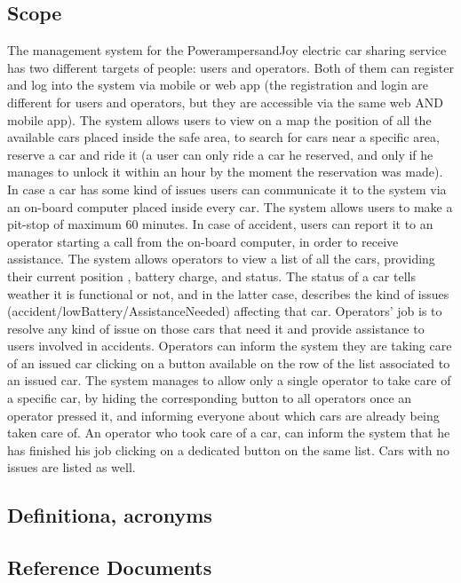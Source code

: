 \documentclass{article}
\begin{document}
\subsection{Scope} %
The management system for the  Power{ampersand}Joy electric car sharing service has two different targets of people: users and operators. 
Both of them can register and log into the system via mobile or web app (the registration and login are different for users and operators, but they are accessible via the same web AND mobile app). 
The system allows users to view on a map the position of all the available cars placed inside the safe area, to search for cars  near a specific area, reserve a car and ride it (a user can only ride a car he reserved, and only if he manages to unlock it within an hour by the moment the reservation was made). In case a car has some kind of issues users can communicate it to the system via an on-board computer placed inside every car. The system allows users to make a pit-stop of maximum 60 minutes. In case of accident, users can report it to an operator starting a call from the on-board computer, in order to receive assistance.
The system allows operators to view a list of all the cars, providing their current position , battery charge, and status. The status of a car tells weather it is functional or not, and in the latter case, describes the kind of issues (accident/lowBattery/AssistanceNeeded) affecting that car. Operators' job is to resolve any kind of issue on those cars that need it and provide assistance to users involved in accidents. Operators can inform the system they are taking care of an issued car clicking on a button available on the row of the list associated to an issued car. The system manages to allow only a single operator to take care of a specific car, by hiding the corresponding button to all operators once an operator pressed it, and informing everyone about which cars are already being taken care of. An operator who took care of a car, can inform the system that he has finished his job clicking on a dedicated button on the same list. Cars with no issues are listed as well.

\subsection{Definitiona, acronyms} %

\subsection{Reference Documents} %
\end{document}
